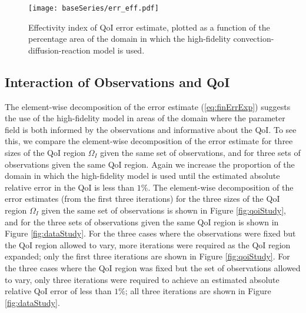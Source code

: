 \begin{figure}[h]
\centering
\texttt{[image: baseSeries/err\_eff.pdf]}
\caption{Effectivity index of QoI error estimate, plotted as a function of the percentage area of the domain in which the high-fidelity convection-diffusion-reaction model is used.}
\label{fig:baseErrEff}
\end{figure}

\subsection{Interaction of Observations and QoI}

The element-wise decomposition of the error estimate (\ref{eq:finErrExp}) suggests the use of the high-fidelity model in areas of the domain where the parameter field is both informed by the observations and informative about the QoI. To see this, we compare the element-wise decomposition of the error estimate for three sizes of the QoI region $\Omega_I$ given the same set of observations, and for three sets of observations given the same QoI region. Again we increase the proportion of the domain in which the high-fidelity model is used until the estimated absolute relative error in the QoI is less than $1\%$. The element-wise decomposition of the error estimates (from the first three iterations) for the three sizes of the QoI region $\Omega_I$ given the same set of observations is shown in Figure \ref{fig:qoiStudy}, and for the three sets of observations given the same QoI region is shown in Figure \ref{fig:dataStudy}. For the three cases where the observations were fixed but the QoI region allowed to vary, more iterations were required as the QoI region expanded; only the first three iterations are shown in Figure \ref{fig:qoiStudy}. For the three cases where the QoI region was fixed but the set of observations allowed to vary, only three iterations were required to achieve an estimated absolute relative QoI error of less than $1\%$; all three iterations are shown in Figure \ref{fig:dataStudy}. 

